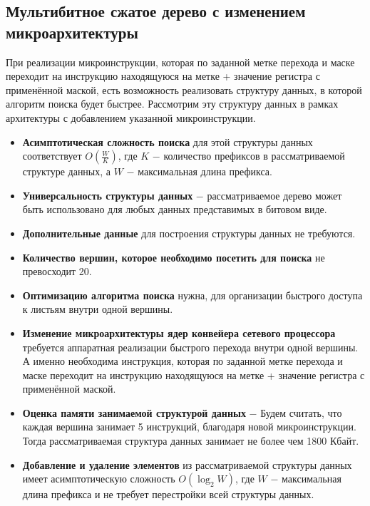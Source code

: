 \documentclass[a4paper, 12pt, titlepage, finall]{extreport}
\begin{document}
        \subsection{Мультибитное сжатое дерево с изменением микроархитектуры}
            При реализации микроинструкции, которая по заданной метке перехода и маске переходит на инструкцию находящуюся на метке + значение регистра с применённой маской,
            есть возможность реализовать структуру данных, в которой алгоритм поиска будет быстрее. Рассмотрим эту структуру данных в рамках архитектуры с добавлением указанной микроинструкции.\\
            \begin{itemize}
                \item\textbf{Асимптотическая сложность поиска} для этой структуры данных соответствует {\ttfamily $O(\frac{W}{K})$},
                где {\ttfamily $K$} $-$ количество префиксов в рассматриваемой структуре данных, а {\ttfamily $W$} $-$ максимальная длина префикса.
                \item\textbf{Универсальность структуры данных} $-$ рассматриваемое дерево может быть использовано для любых данных представимых в битовом виде.
                \item\textbf{Дополнительные данные} для построения структуры данных не требуются.
                \item\textbf{Количество вершин, которое необходимо посетить для поиска} не превосходит 20.
                \item\textbf{Оптимизацию алгоритма поиска} нужна, для организации быстрого доступа к листьям внутри одной вершины.
                \item\textbf{Изменение микроархитектуры ядер конвейера сетевого процессора} требуется аппаратная реализации быстрого перехода внутри одной вершины.
                А именно необходима инструкция, которая по заданной метке перехода и маске переходит на инструкцию находящуюся на метке + значение регистра с применённой маской.
                \item\textbf{Оценка памяти занимаемой структурой данных} $-$ Будем считать, что каждая вершина занимает 5 инструкций, благодаря новой микроинструкции.
                Тогда рассматриваемая структура данных занимает не более чем 1800 Кбайт.
                \item\textbf{Добавление и удаление элементов} из рассматриваемой структуры данных имеет асимптотическую сложность 
                {\ttfamily $O(\log_2{W})$}, где {\ttfamily $W$} $-$ максимальная длина префикса и не требует перестройки всей структуры данных.\\
            \end{itemize}
\end{document}
